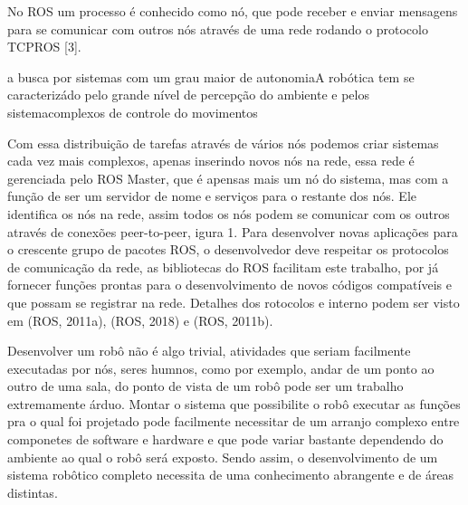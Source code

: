 No ROS um processo é conhecido como nó, que pode receber e enviar mensagens para se comunicar com outros nós através de uma rede rodando o protocolo TCPROS [3].










a busca por sistemas com um grau maior de autonomiaA robótica tem se caracterizádo pelo grande nível de percepção do ambiente e pelos sistemacomplexos de controle do movimentos 

Com essa distribuição de tarefas através de vários nós podemos criar sistemas cada vez mais complexos, apenas inserindo novos nós na rede, essa rede é gerenciada pelo ROS Master, que é apensas mais um nó do sistema, mas com a função de ser um servidor de nome e serviços para o restante dos nós. Ele identifica os nós na rede, assim todos os nós podem se comunicar com os outros através de conexões peer-to-peer, igura 1. Para desenvolver novas aplicações para o crescente grupo de pacotes ROS, o desenvolvedor deve respeitar os protocolos de comunicação da rede, as bibliotecas do ROS facilitam este trabalho, por já fornecer funções prontas para o desenvolvimento de novos códigos compatíveis e que possam se registrar na rede. Detalhes dos  rotocolos e interno podem ser visto em (ROS, 2011a), (ROS, 2018) e (ROS, 2011b).


Desenvolver um robô não é algo trivial, atividades que seriam facilmente executadas por nós, seres humnos, como por exemplo, andar de um ponto ao outro de uma sala, do ponto de vista de um robô pode ser um trabalho extremamente árduo. Montar o sistema que possibilite o robô executar as funções pra o qual foi projetado pode facilmente necessitar de um arranjo complexo entre componetes de software e hardware e que pode variar bastante dependendo do ambiente ao qual o robô será exposto. Sendo assim, o desenvolvimento de um sistema robôtico completo necessita de uma conhecimento abrangente e de áreas distintas.  

